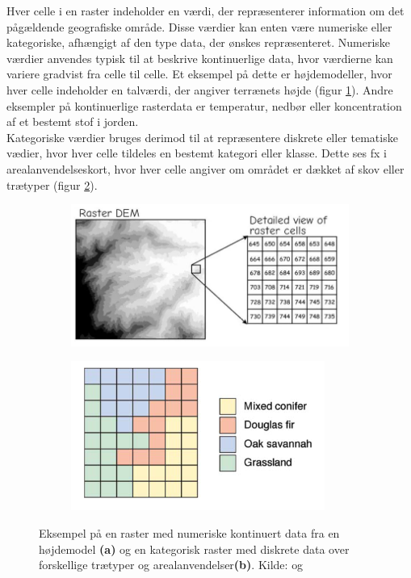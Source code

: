 Hver celle i en raster indeholder en værdi, der repræsenterer information om det pågældende geografiske område. Disse værdier kan enten være numeriske eller kategoriske, afhængigt af den type data, der ønskes repræsenteret. Numeriske værdier anvendes typisk til at beskrive kontinuerlige data, hvor værdierne kan variere gradvist fra celle til celle. Et eksempel på dette er højdemodeller, hvor hver celle indeholder en talværdi, der angiver terrænets højde (figur \ref{Subfig: Kontinuer raster}). Andre eksempler på kontinuerlige rasterdata er temperatur, nedbør eller koncentration af et bestemt stof i jorden. \\
Kategoriske værdier bruges derimod til at repræsentere diskrete eller tematiske vædier, hvor hver celle tildeles en bestemt kategori eller klasse. Dette ses fx i arealanvendelseskort, hvor hver celle angiver om området er dækket af skov eller trætyper (figur \ref{Subfig: Kategorisk raster}).
\begin{figure}[H]
    \begin{subfigure} [t]{0.5\textwidth}
        \centering
        \includegraphics[width=1\linewidth]{images/teori/raster_kontinuert.jpg}
        \caption{}
        \label{Subfig: Kontinuer raster}
    \end{subfigure}
    \begin{subfigure} [t]{0.5\textwidth}
        \centering
        \includegraphics[width=1\linewidth]{images/teori/raster_areal.png}
        \caption{}
        \label{Subfig: Kategorisk raster}
    \end{subfigure}
    \caption{Eksempel på en raster med numeriske kontinuert data fra en højdemodel \textbf{(a)} og en kategorisk raster med diskrete data over forskellige trætyper og arealanvendelser\textbf{(b)}. Kilde: \cite[s. 66]{bolstad_gis_2022} og \cite[s. 67]{longley_geographical_2008}}
    \label{Figur: Kontinuert og kategorisk raster}
\end{figure}
